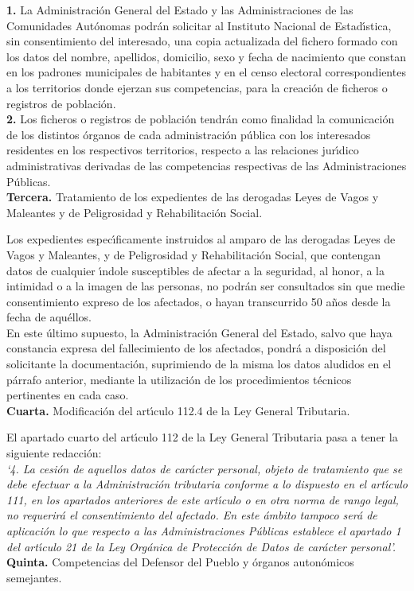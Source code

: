 {\bf 1.} La Administraci\'on General del Estado y las Administraciones de las 
Comunidades Aut\'onomas podr\'an solicitar al Instituto Nacional de 
Estad\'{\i}stica, sin consentimiento del interesado, una copia actualizada del 
fichero formado con los datos del nombre, apellidos, domicilio, sexo y fecha de 
nacimiento que constan en los padrones municipales de habitantes y en el censo 
electoral correspondientes a los territorios donde ejerzan sus competencias, 
para la creaci\'on de ficheros o registros de poblaci\'on.\\

{\bf 2.} Los ficheros o registros de poblaci\'on tendr\'an como finalidad la 
comunicaci\'on de los distintos \'organos de cada administraci\'on p\'ublica 
con los interesados residentes en los respectivos territorios, respecto a las 
relaciones jur\'{\i}dico administrativas derivadas de las competencias 
respectivas de las Administraciones P\'ublicas.
\vspace{0.3cm}\\
{\large {\bf Tercera.} Tratamiento de los expedientes de las derogadas Leyes de 
Vagos y Maleantes y de Peligrosidad y Rehabilitaci\'on Social.}

Los expedientes espec\'{\i}ficamente instruidos al amparo de las derogadas 
Leyes de Vagos y Maleantes, y de Peligrosidad y Rehabilitaci\'on Social, que 
contengan datos de cualquier \'{\i}ndole susceptibles de afectar a la seguridad,
al honor, a la intimidad o a la imagen de las personas, no podr\'an ser 
consultados sin que medie consentimiento expreso de los afectados, o hayan 
transcurrido 50 a\~nos desde la fecha de aqu\'ellos.\\
En este \'ultimo supuesto, la Administraci\'on General del Estado, salvo que 
haya constancia expresa del fallecimiento de los afectados, pondr\'a a 
disposici\'on del solicitante la documentaci\'on, suprimiendo de la misma los 
datos aludidos en el p\'arrafo anterior, mediante la utilizaci\'on de los 
procedimientos t\'ecnicos pertinentes en cada caso.
\vspace{0.3cm}\\
{\large {\bf Cuarta.} Modificaci\'on del art\'{\i}culo 112.4 de la Ley General 
Tributaria.}

El apartado cuarto del art\'{\i}culo 112 de la Ley General Tributaria pasa a 
tener la siguiente redacci\'on:\\
{\it `4. La cesi\'on de aquellos datos de car\'acter personal, objeto de 
tratamiento que se debe efectuar a la Administraci\'on tributaria conforme a lo 
dispuesto en el art\'{\i}culo 111, en los apartados anteriores de este 
art\'{\i}culo o en otra norma de rango legal, no requerir\'a el consentimiento 
del afectado. En este \'ambito tampoco ser\'a de aplicaci\'on lo que respecto a 
las Administraciones P\'ublicas establece el apartado 1 del art\'{\i}culo 21 de 
la Ley Org\'anica de Protecci\'on de Datos de car\'acter personal'.}
\vspace{0.3cm}\\
{\large {\bf Quinta.} Competencias del Defensor del Pueblo y \'organos 
auton\'omicos semejantes.}

